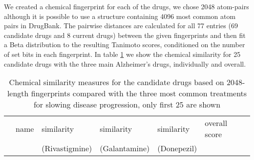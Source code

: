 \documentclass[preprint,12pt]{elsarticle}
\begin{document}
We created a chemical fingerprint for each of the drugs, we chose 2048 atom-pairs although it is possible to use a structure containing 4096 most common atom pairs in DrugBank. The pairwise distances are calculated for all 77 entries (69 candidate drugs and 8 current drugs) between the given fingerprints and then fit a Beta distribution to the resulting Tanimoto scores, conditioned on the number of set bits in each fingerprint. In table \ref{comp1} we show the chemical similarity for 25 candidate drugs with the three main Alzheimer's drugs, individually and overall.


\begin{table}[h]
\scriptsize
  \centering \caption{Chemical similarity measures for the candidate drugs based on 2048-length fingerprints compared with the three most common treatments for slowing disease progression, only first 25 are shown}\label{comp1}
\centering
\begin{tabular}{llllll}
  \hline
 & name & similarity & similarity & similarity & overall score\\ 
              &                   & (Rivastigmine) & (Galantamine)  & (Donepezil)          & \\
  \hline 
  

\end{tabular}
\end{table}
\end{document}
